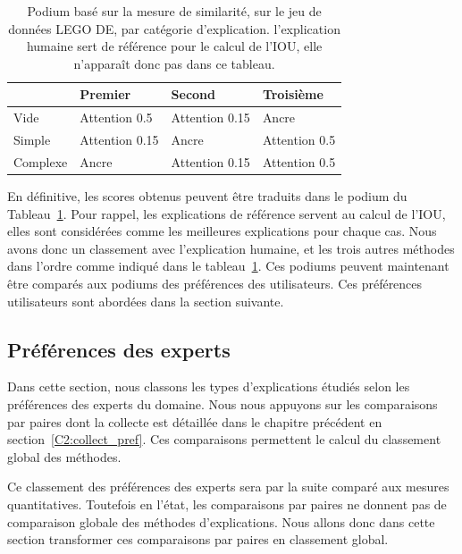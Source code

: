 \begin{table}[h!tpb]
    \centering
    \addtolength{\parskip}{-0.5mm}
  \caption{Podium basé sur la mesure de similarité, sur le jeu de données LEGO DE, par catégorie d'explication. l'explication humaine sert de référence pour le calcul de l’IOU, elle n'apparaît donc pas dans ce tableau.}\label{qtm_podium}
\begin{tabular}{|l|l|l|l|}
    \hline
        & \textbf{Premier}  & \textbf{Second} & \textbf{Troisième} \\ \hline
Vide     &  Attention 0.5  & Attention 0.15  & Ancre         \\ \hline
Simple   &  Attention 0.15 & Ancre          & Attention 0.5  \\ \hline
Complexe &  Ancre         & Attention 0.15  & Attention 0.5  \\ \hline
\end{tabular}
\end{table}

En définitive, les scores obtenus peuvent être traduits dans le podium du Tableau~\ref{qtm_podium}. Pour rappel, les explications de référence servent au calcul de l'IOU, elles sont considérées comme les meilleures explications pour chaque cas.
Nous avons donc un classement avec l'explication humaine, et les trois autres méthodes dans l'ordre comme indiqué dans le tableau~\ref{qtm_podium}. Ces podiums peuvent maintenant être comparés aux podiums des préférences des utilisateurs. Ces préférences utilisateurs sont abordées dans la section suivante.

\subsection{Préférences des experts} \label{C3:pref_humaine}

Dans cette section, nous classons les types d'explications étudiés selon les préférences des experts du domaine. Nous nous appuyons sur les comparaisons par paires dont la collecte est détaillée dans le chapitre précédent en section~\ref{C2:collect_pref}.
Ces comparaisons permettent le calcul du classement global des méthodes.

Ce classement des préférences des experts sera par la suite comparé aux mesures quantitatives. Toutefois en l'état, les comparaisons par paires ne donnent pas de comparaison globale des méthodes d'explications. Nous allons donc dans cette section transformer ces comparaisons par paires en classement global.

